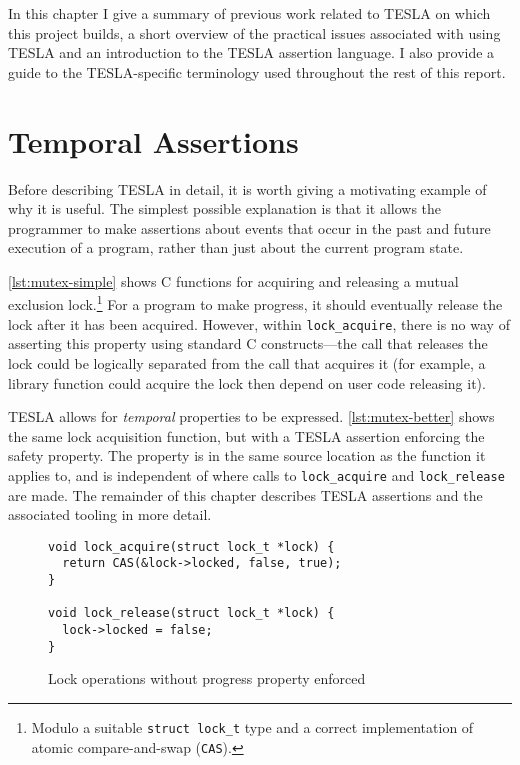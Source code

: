 In this chapter I give a summary of previous work related to TESLA on which this
project builds, a short overview of the practical issues associated with using
TESLA and an introduction to the TESLA assertion language. I also provide a
guide to the TESLA-specific terminology used throughout the rest of this report.

\section{Temporal Assertions}

Before describing TESLA in detail, it is worth giving a motivating example of
why it is useful. The simplest possible explanation is that it allows the
programmer to make assertions about events that occur in the past and future
execution of a program, rather than just about the current program state.

\autoref{lst:mutex-simple} shows C functions for acquiring and releasing a
mutual exclusion lock.\footnote{Modulo a suitable \texttt{struct lock_t}
type and a correct implementation of atomic compare-and-swap
(\texttt{CAS}).} For a program to make progress, it should eventually
release the lock after it has been acquired.  However, within
\texttt{lock_acquire}, there is no way of asserting this property using
standard C constructs---the call that releases the lock could be logically
separated from the call that acquires it (for example, a library function could
acquire the lock then depend on user code releasing it).

TESLA allows for \emph{temporal} properties to be expressed.
\autoref{lst:mutex-better} shows the same lock acquisition function, but with a
TESLA assertion enforcing the safety property. The property is in the same
source location as the function it applies to, and is independent of where calls
to \texttt{lock_acquire} and \texttt{lock_release} are made. The
remainder of this chapter describes TESLA assertions and the associated tooling
in more detail.

\begin{figure}
  \begin{verbatim}
void lock_acquire(struct lock_t *lock) {
  return CAS(&lock->locked, false, true);
}

void lock_release(struct lock_t *lock) {
  lock->locked = false;
}
  \end{verbatim}
  \caption{Lock operations without progress property enforced}
  \label{lst:mutex-simple}
\end{figure}

